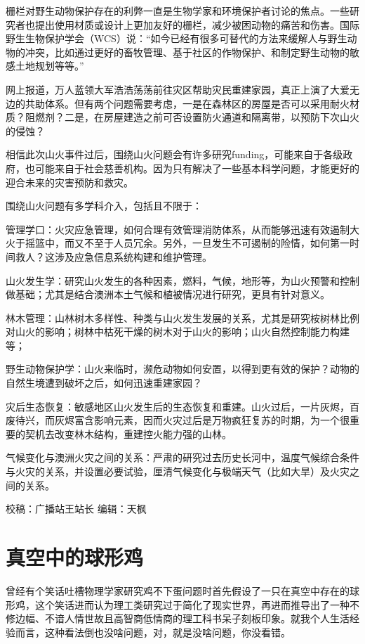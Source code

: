 \documentclass[]{book}
\begin{document}
栅栏对野生动物保护存在的利弊一直是生物学家和环境保护者讨论的焦点。一些研究者也提出使用材质或设计上更加友好的栅栏，减少被困动物的痛苦和伤害。国际野生生物保护学会（WCS）说：``如今已经有很多可替代的方法来缓解人与野生动物的冲突，比如通过更好的畜牧管理、基于社区的作物保护、和制定野生动物的敏感土地规划等等。''

网上报道，万人蓝领大军浩浩荡荡前往灾区帮助灾民重建家园，真正上演了大爱无边的共助体系。但有两个问题需要考虑，一是在森林区的房屋是否可以采用耐火材质？阻燃剂？二是，在房屋建造之前可否设置防火通道和隔离带，以预防下次山火的侵蚀？

相信此次山火事件过后，围绕山火问题会有许多研究funding，可能来自于各级政府，也可能来自于社会慈善机构。因为只有解决了一些基本科学问题，才能更好的迎合未来的灾害预防和救灾。

围绕山火问题有多学科介入，包括且不限于：

管理学口：火灾应急管理，如何合理有效管理消防体系，从而能够迅速有效遏制大火于摇篮中，而又不至于人员冗余。另外，一旦发生不可遏制的险情，如何第一时间救人？这涉及应急信息系统构建和维护管理。

山火发生学：研究山火发生的各种因素，燃料，气候，地形等，为山火预警和控制做基础；尤其是结合澳洲本土气候和植被情况进行研究，更具有针对意义。

林木管理：山林树木多样性、种类与山火发生发展的关系，尤其是研究桉树林比例对山火的影响；树林中枯死干燥的树木对于山火的影响；山火自然控制能力构建等；

野生动物保护学：山火来临时，濒危动物如何安置，以得到更有效的保护？动物的自然生境遭到破坏之后，如何迅速重建家园？

灾后生态恢复：敏感地区山火发生后的生态恢复和重建。山火过后，一片灰烬，百废待兴，而灰烬富含影响元素，因而火灾过后是万物疯狂复苏的时期，为一个很重要的契机去改变林木结构，重建控火能力强的山林。

气候变化与澳洲火灾之间的关系：严肃的研究过去历史长河中，温度气候综合条件与火灾的关系，并设置必要试验，厘清气候变化与极端天气（比如大旱）及火灾之间的关系。

校稿：广播站王站长
编辑：天枫

\hypertarget{ux771fux7a7aux4e2dux7684ux7403ux5f62ux9e21}{%
\section{真空中的球形鸡}\label{ux771fux7a7aux4e2dux7684ux7403ux5f62ux9e21}}

曾经有个笑话吐槽物理学家研究鸡不下蛋问题时首先假设了一只在真空中存在的球形鸡，这个笑话进而认为理工类研究过于简化了现实世界，再进而推导出了一种不修边幅、不谙人情世故且高智商低情商的理工科书呆子刻板印象。就我个人生活经验而言，这种看法倒也没啥问题，对，就是没啥问题，你没看错。
\end{document}
